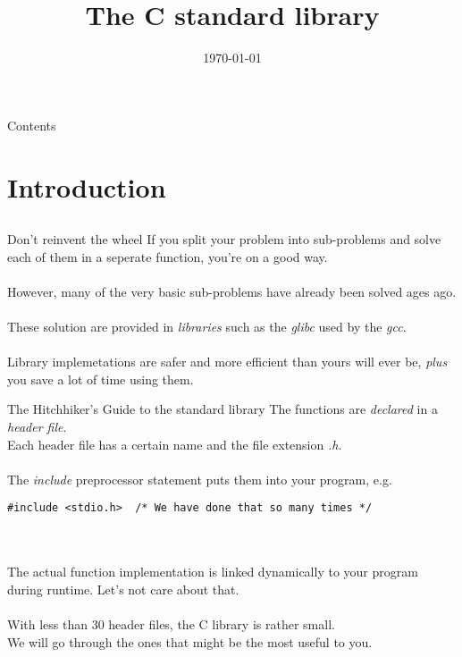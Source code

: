 
\newcommand{\topic}{
	The C standard library
}

\title{\topic}
\supertitle{\course}
\date{\today}



\maketitle

\begin{frame}{Contents}
	\tableofcontents
\end{frame}

\section{Introduction}
\subsection{}
\begin{frame}{Don't reinvent the wheel}
	If you split your problem into sub-problems and solve each of them in a seperate function, you're on a good way. \\ \ \\
	However, many of the very basic sub-problems have already been solved ages ago. \\ \ \\
	These solution are provided in \textit{libraries} such as the \textit{glibc} used by the \textit{gcc}. \\ \ \\
	Library implemetations are safer and more efficient than yours will ever be, \textit{plus} you save a lot of time using them.
\end{frame}
\begin{frame}[fragile]{The Hitchhiker's Guide to the standard library}
	The functions are \textit{declared} in a \textit{header file}. \\
	Each header file has a certain name and the file extension \textit{.h}. \\ \ \\
	The \textit{include} preprocessor statement puts them into your program, e.g.
\begin{lstlisting}[numbers=none]
#include <stdio.h>	/* We have done that so many times */
\end{lstlisting} \ \\ \ \\
	The actual function implementation is linked dynamically to your program during runtime. Let's not care about that. \\ \ \\
	With less than 30 header files, the C library is rather small. \\
	We will go through the ones that might be the most useful to you.
\end{frame}

